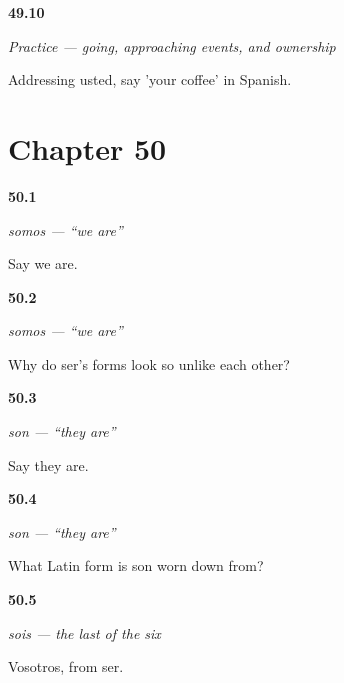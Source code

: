 \noindent\begin{minipage}[t]{\linewidth}
\raggedright
\hypertarget{review-ES-C10-practice-possessive}{\textbf{49.10}} \emph{Practice — going, approaching events, and ownership}\par
\small Addressing usted, say 'your coffee' in Spanish.
\end{minipage}\par\medskip

\section*{Chapter 50}

\noindent\begin{minipage}[t]{\linewidth}
\raggedright
\hypertarget{review-ES-C09-somos-form}{\textbf{50.1}} \emph{somos — \textquotedblleft{}we are\textquotedblright{}}\par
\small Say we are.
\end{minipage}\par\medskip

\noindent\begin{minipage}[t]{\linewidth}
\raggedright
\hypertarget{review-ES-C09-somos-why}{\textbf{50.2}} \emph{somos — \textquotedblleft{}we are\textquotedblright{}}\par
\small Why do ser's forms look so unlike each other?
\end{minipage}\par\medskip

\noindent\begin{minipage}[t]{\linewidth}
\raggedright
\hypertarget{review-ES-C09-son-form}{\textbf{50.3}} \emph{son — \textquotedblleft{}they are\textquotedblright{}}\par
\small Say they are.
\end{minipage}\par\medskip

\noindent\begin{minipage}[t]{\linewidth}
\raggedright
\hypertarget{review-ES-C09-son-latin}{\textbf{50.4}} \emph{son — \textquotedblleft{}they are\textquotedblright{}}\par
\small What Latin form is son worn down from?
\end{minipage}\par\medskip

\noindent\begin{minipage}[t]{\linewidth}
\raggedright
\hypertarget{review-ES-C09-sois-form}{\textbf{50.5}} \emph{sois — the last of the six}\par
\small Vosotros, from ser.
\end{minipage}\par\medskip

